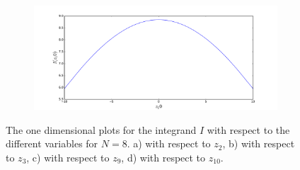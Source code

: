 \begin{figure}
\begin{subfigure}{.4\textwidth}
		\caption{}
	\end{subfigure}%
	\begin{subfigure}{.4\textwidth}
		\centering
			\includegraphics[width=1\linewidth]{./figures/basket_call_2d_time_stepping/integrand_plotting/N_8/1d_plots/smoothed_integrand_basket_2D_N_8_z10}
		\caption{}
		\end{subfigure}
	\caption{The one dimensional plots for the integrand $I$ with respect to the different variables for $N=8$. a) with respect to $z_2$, b) with respect to $z_3$, c) with respect to $z_9$,  d) with respect to $z_10$.}
	\label{fig:integrand_one_dim_N_8}
\end{figure}
\FloatBarrier


